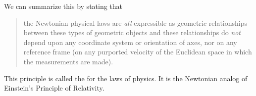 We can summarize this by stating that
\begin{quote}
the Newtonian physical laws are \emph{all} expressible as geometric relationships between these types of geometric objects and these relationships do \emph{not} depend upon any coordinate system or orientation of axes, nor on any reference frame (on any purported velocity of the Euclidean space in which the measurements are made).
\end{quote}
This principle is called the  for the laws of physics. It is the Newtonian analog of Einstein's Principle of Relativity.
